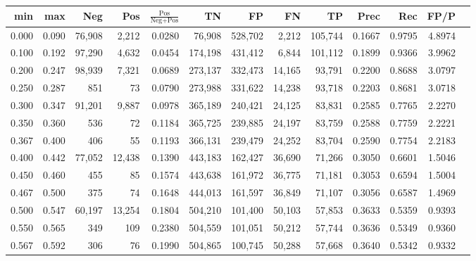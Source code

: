 \begin{tabular}{rrrrrrrrrrrrr}
\toprule
  min &   max &    Neg &    Pos & $\frac{\text{Pos}}{\text{Neg}+\text{Pos}}$ &      TN &      FP &      FN &      TP &   Prec &    Rec &   FP/P \\
\midrule
0.000 & 0.090 & 76,908 &  2,212 &                                     0.0280 &  76,908 & 528,702 &   2,212 & 105,744 & 0.1667 & 0.9795 & 4.8974 \\
0.100 & 0.192 & 97,290 &  4,632 &                                     0.0454 & 174,198 & 431,412 &   6,844 & 101,112 & 0.1899 & 0.9366 & 3.9962 \\
0.200 & 0.247 & 98,939 &  7,321 &                                     0.0689 & 273,137 & 332,473 &  14,165 &  93,791 & 0.2200 & 0.8688 & 3.0797 \\
0.250 & 0.287 &    851 &     73 &                                     0.0790 & 273,988 & 331,622 &  14,238 &  93,718 & 0.2203 & 0.8681 & 3.0718 \\
0.300 & 0.347 & 91,201 &  9,887 &                                     0.0978 & 365,189 & 240,421 &  24,125 &  83,831 & 0.2585 & 0.7765 & 2.2270 \\
0.350 & 0.360 &    536 &     72 &                                     0.1184 & 365,725 & 239,885 &  24,197 &  83,759 & 0.2588 & 0.7759 & 2.2221 \\
0.367 & 0.400 &    406 &     55 &                                     0.1193 & 366,131 & 239,479 &  24,252 &  83,704 & 0.2590 & 0.7754 & 2.2183 \\
0.400 & 0.442 & 77,052 & 12,438 &                                     0.1390 & 443,183 & 162,427 &  36,690 &  71,266 & 0.3050 & 0.6601 & 1.5046 \\
0.450 & 0.460 &    455 &     85 &                                     0.1574 & 443,638 & 161,972 &  36,775 &  71,181 & 0.3053 & 0.6594 & 1.5004 \\
0.467 & 0.500 &    375 &     74 &                                     0.1648 & 444,013 & 161,597 &  36,849 &  71,107 & 0.3056 & 0.6587 & 1.4969 \\
0.500 & 0.547 & 60,197 & 13,254 &                                     0.1804 & 504,210 & 101,400 &  50,103 &  57,853 & 0.3633 & 0.5359 & 0.9393 \\
0.550 & 0.565 &    349 &    109 &                                     0.2380 & 504,559 & 101,051 &  50,212 &  57,744 & 0.3636 & 0.5349 & 0.9360 \\
0.567 & 0.592 &    306 &     76 &                                     0.1990 & 504,865 & 100,745 &  50,288 &  57,668 & 0.3640 & 0.5342 & 0.9332 \\

\end{tabular}
